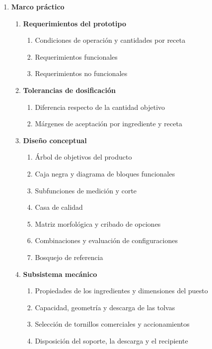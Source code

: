 \begin{enumerate}[label*=\arabic*.]
    \item \textbf{Marco práctico}
    \begin{enumerate}[label*=\arabic*.]
        \item \textbf{Requerimientos del prototipo}
        \begin{enumerate}[label*=\arabic*.]
            \item Condiciones de operación y cantidades por receta
            \item Requerimientos funcionales
            \item Requerimientos no funcionales
        \end{enumerate}

        \item \textbf{Tolerancias de dosificación}
        \begin{enumerate}[label*=\arabic*.]
            \item Diferencia respecto de la cantidad objetivo
            \item Márgenes de aceptación por ingrediente y receta
        \end{enumerate}

        \item \textbf{Diseño conceptual}
        \begin{enumerate}[label*=\arabic*.]
            \item Árbol de objetivos del producto
            \item Caja negra y diagrama de bloques funcionales
            \item Subfunciones de medición y corte
            \item Casa de calidad
            \item Matriz morfológica y cribado de opciones
            \item Combinaciones y evaluación de configuraciones
            \item Bosquejo de referencia
        \end{enumerate}

        \item \textbf{Subsistema mecánico}
        \begin{enumerate}[label*=\arabic*.]
            \item Propiedades de los ingredientes y dimensiones del puesto
            \item Capacidad, geometría y descarga de las tolvas
            \item Selección de tornillos comerciales y accionamientos
            \item Disposición del soporte, la descarga y el recipiente
        \end{enumerate}


\end{enumerate}
\end{enumerate}
